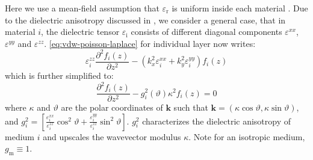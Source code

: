 %
Here we use a mean-field assumption that $\varepsilon_{\mathrm{r}}$ is
uniform inside each material .
%
Due to the dielectric anisotropy discussed in , we consider a general case, that in material $i$,
the dielectric tensor $\varepsilon_{\mathrm{i}}$ consists of different
diagonal components \(\varepsilon^{xx}\), \(\varepsilon^{yy}\) and
\(\varepsilon^{zz}\). \autoref{eq:vdw-poisson-laplace} for individual
layer now writes:
\begin{equation}
\label{eq:vdw-laplace-2}
\varepsilon_{i}^{zz} \frac{\partial^{2} f_{i}(z)}{\partial z^{2}}
- (k_{x}^{2} \varepsilon_{i}^{xx} + k_{y}^{2} \varepsilon_{i}^{yy}) f_{i}(z)
\end{equation}
which is further simplified to:
\begin{equation}
\label{eq:vdw-laplace-3}
\frac{\partial^{2} f_{i}(z)}{\partial z^{2}}
- g_{i}^{2}(\vartheta) \kappa^{2} f_{i}(z) =0
\end{equation}
where $\kappa$ and $\vartheta$ are the polar coordinates of
$\mathbf{k}$ such that
\(\mathbf{k} = (\kappa \cos\mathcal{\vartheta}, \kappa\sin
\mathcal{\vartheta})\), and
\(g_{i}^{2} = {\displaystyle
  [\frac{\varepsilon_{i}^{xx}}{\varepsilon_{i}^{zz}} \cos^{2}
  \vartheta + \frac{\varepsilon_{i}^{yy}}{\varepsilon_{i}^{zz}}
  \sin^{2} \vartheta]}\).
%
\(g_{i}^{2}\) characterizes the dielectric anisotropy of medium $i$
and upscales the wavevector modulus \(\kappa\). Note for an isotropic
medium, $g_{\mathrm{m}}\equiv1$. 

